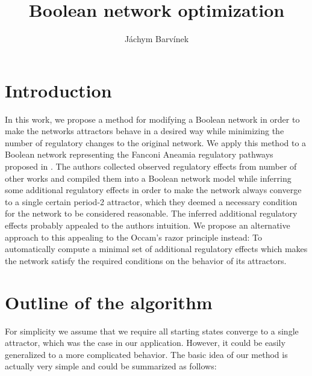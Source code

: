 \documentclass[a4paper,10pt]{article}
\title{Boolean network optimization}
\author{Jáchym Barvínek}
\begin{document}
\maketitle


\section{Introduction}
In this work, we propose a method for modifying a Boolean network
in order to make the networks attractors behave in a desired way
while minimizing the number of regulatory changes to the original
network. We apply this method to a Boolean network representing
the Fanconi Aneamia regulatory pathways proposed in \cite{rodriguez1}.
The authors collected observed regulatory effects from number of 
other works and compiled them into a Boolean network model while
inferring some additional regulatory effects in order to make the
network always converge to a single certain period-2 attractor,
which they deemed a necessary condition for the network to be 
considered reasonable. The inferred additional regulatory effects
probably appealed to the authors intuition. We propose an alternative
approach to this appealing to the Occam's razor principle instead: To
automatically compute a minimal set of additional regulatory effects
which makes the network satisfy the required conditions on the
behavior of its attractors.

\section{Outline of the algorithm}
For simplicity we assume that we require all starting states converge
to a single attractor, which was the case in our application.
However, it could be easily generalized to a more complicated behavior.
The basic idea of our method is actually very simple and could be summarized
as follows:
\end{document}
